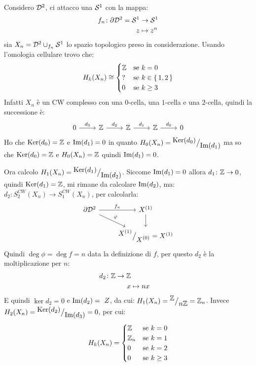 \begin{example}
  Considero $ \mathcal{D}^{2} $, ci attacco una $ \mathcal{S}^{1} $ con la mappa:
  \begin{align*}
    f_n \colon \partial \mathcal{D}^{2} = \mathcal{S}^{1} & \to \mathcal{S}^{1} \\
    z & \mapsto z^n
  \end{align*}
  sia $ X_n = \mathcal{D}^{2} \cup_{f_n} \mathcal{S}^{1} $ lo spazio topologico preso in considerazione.
  Usando l'omologia cellulare trovo che:
  \[
    H_k(X_n) \cong
    \begin{cases}
      \mathbb{Z} & \text{se } k = 0 \\
      ? & \text{se } k \in \set{1,2} \\
      0 & \text{se } k \geq 3
    \end{cases}
  \]
  Infatti $ X_n $ è un CW complesso con una $ 0 $-cella, una $ 1 $-cella e una $ 2 $-cella,
  quindi la successione è:
  \[
    \begin{tikzcd}
      0 \rar{d_3} & \Z \rar{d_2} & \Z \rar{d_1} & \Z \rar{d_0} & 0
    \end{tikzcd}
  \]
  Ho che $ \mathrm{Ker}( d_0) = \mathbb{Z} $ e $ \mathrm{Im}( d_1 ) = 0 $ in quanto $ H_0(X_n) = {^{\textstyle \mathrm{Ker}( d_0)}\big/_{\textstyle \mathrm{Im}( d_1 )}} $
  ma so che $ \mathrm{Ker}( d_0) = \mathbb{Z} $ e $ H_0(X_n) = \mathbb{Z} $ quindi $ \mathrm{Im}( d_1 ) = 0 $.

  Ora calcolo $ H_1(X_n) = {^{\textstyle \mathrm{Ker}( d_1)}\big/_{\textstyle \mathrm{Im}( d_2 )}} $. Siccome $ \mathrm{Im}( d_1 ) = 0 $ allora $ d_1 \colon \mathbb{Z} \to 0 $,
  quindi $ \mathrm{Ker}( d_1) = \mathbb{Z} $, mi rimane da calcolare $ \mathrm{Im}( d_2 ) $, ma:
  $ d_2 \colon S_2^{CW}(X_n) \to S_1^{CW}(X_n) $, per calcolarla:
  \[
    \begin{tikzcd}
      \partial \Disk{2} \rar{f_n} \arrow{rd}{\phi} & X^{(1)} \dar \\
      {} & \quot{X^{(1)}}{X^{(0)}} = X^{(1)}
    \end{tikzcd}
  \]
  Quindi $ \deg{\phi} = \deg{f} = n $ data la definizione di $ f $, per questo $ d_2 $ è la moltiplicazione
  per $ n $:
  \begin{align*}
    d_2 \colon \mathbb{Z} \to \mathbb{Z} \\
    x & \mapsto n x
  \end{align*}
  E quindi $ \ker{d_2} = 0 $ e $ \mathrm{Im}( d_2 ) = \ Z $, da cui: $ H_1(X_n) = {^{\textstyle \mathbb{Z}}\big/_{\textstyle n \mathbb{Z}}} = \mathbb{Z}_n $.
  Invece $ H_2(X_n) = {^{\textstyle \mathrm{Ker}( d_2)}\big/_{\textstyle \mathrm{Im}( d_3 )}} = 0 $, per cui:
  \[
    H_k(X_n) =
    \begin{cases}
      \mathbb{Z} & \text{se } k = 0 \\
      \mathbb{Z}_n & \text{se } k = 1 \\
      0 & \text{se } k = 2 \\
      0 & \text{se } k \geq 3
    \end{cases}
  \]

\end{example}

